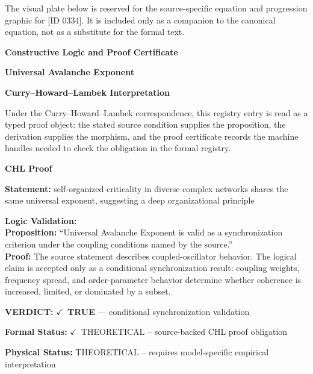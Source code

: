 \begingroup\footnotesize\sloppy
The visual plate below is reserved for the source-specific equation and progression graphic for [ID 0334]. It is included only as a companion to the canonical equation, not as a substitute for the formal text.
\par\endgroup
\ifTZPDarkEdition
{}
\fi

\clearpage
\begingroup\tzpsupportsetup
\noindent\textbf{\fontsize{10.8pt}{12.8pt}\selectfont [ID 0334] Constructive Logic and Proof Certificate}\par
\noindent\textbf{\fontsize{10pt}{12pt}\selectfont Universal Avalanche Exponent}\par
\vspace{0.45em}
\begingroup
\footnotesize
\setlength{\parskip}{0.22em}
\setlength{\parindent}{0pt}
\noindent\textbf{Curry--Howard--Lambek Interpretation}\par
Under the Curry--Howard--Lambek correspondence, this registry entry is read as a typed proof
object: the stated source condition supplies the proposition, the derivation supplies the
morphism, and the proof certificate records the machine handles needed to check the obligation
in the formal registry.

\vspace{0.45em}
\noindent\textbf{CHL Proof}\par
\textbf{Statement:} self-organized criticality in diverse complex networks shares the same universal
exponent, suggesting a deep organizational principle

\textbf{Logic Validation:}\\
\textbf{Proposition:} ``Universal Avalanche Exponent is valid as a synchronization criterion under the coupling
conditions named by the source.''\\
\textbf{Proof:} The source statement describes coupled-oscillator behavior. The logical claim is
accepted only as a conditional synchronization result: coupling weights, frequency
spread, and order-parameter behavior determine whether coherence is increased, limited,
or dominated by a subset.

\textbf{VERDICT:} \ensuremath{\checkmark}\ \textbf{TRUE} --- conditional synchronization validation

\textbf{Formal Status:} \ensuremath{\checkmark}\ THEORETICAL -- source-backed CHL proof obligation

\textbf{Physical Status:} THEORETICAL -- requires model-specific empirical interpretation
\par\vspace{0.45em}
\par
\ifTZPDarkEdition
{}
\fi
\endgroup
\endgroup
